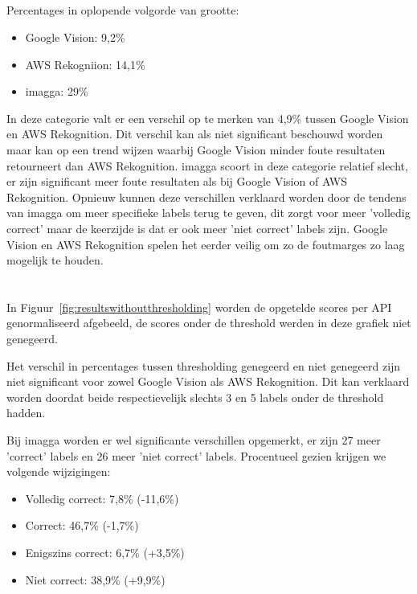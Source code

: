 \subsection{}
\label{sec:resultaten-niet-correct}
Percentages in oplopende volgorde van grootte:
\begin{itemize}
    \item Google Vision: 9,2\%
    \item AWS Rekogniion: 14,1\%
    \item imagga: 29\%
\end{itemize}

In deze categorie valt er een verschil op te merken van 4,9\% tussen Google Vision en AWS Rekognition. Dit verschil kan als niet significant beschouwd worden maar kan op een trend wijzen waarbij Google Vision minder foute resultaten retourneert dan AWS Rekognition. imagga scoort in deze categorie relatief slecht, er zijn significant meer foute resultaten als bij Google Vision of AWS Rekognition. Opnieuw kunnen deze verschillen verklaard worden door de tendens van imagga om meer specifieke labels terug te geven, dit zorgt voor meer 'volledig correct' maar de keerzijde is dat er ook meer 'niet correct' labels zijn. Google Vision en AWS Rekognition spelen het eerder veilig om zo de foutmarges zo laag mogelijk te houden.

\section{}
\label{sec:resultaten-zonder-thresholding}
In Figuur~\ref{fig:resultswithoutthresholding} worden de opgetelde scores per API genormaliseerd afgebeeld, de scores onder de threshold werden in deze grafiek niet genegeerd.

Het verschil in percentages tussen thresholding genegeerd en niet genegeerd zijn niet significant voor zowel Google Vision als AWS Rekognition. Dit kan verklaard worden doordat beide respectievelijk slechts 3 en 5 labels onder de threshold hadden.

Bij imagga worden er wel significante verschillen opgemerkt, er zijn 27 meer 'correct' labels en 26 meer 'niet correct' labels. Procentueel gezien krijgen we volgende wijzigingen:
\begin{itemize}
    \item Volledig correct: 7,8\% (-11,6\%)
    \item Correct: 46,7\% (-1,7\%) 
    \item Enigszins correct: 6,7\% (+3,5\%)
    \item Niet correct: 38,9\% (+9,9\%)
\end{itemize}

